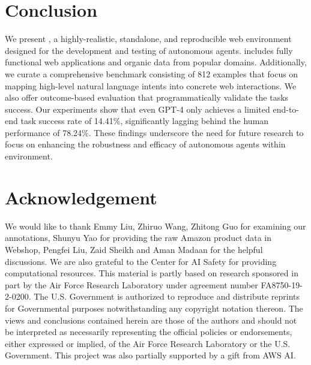 \section{Conclusion}
We present \ours, a highly-realistic, standalone, and reproducible web environment designed for the development and testing of autonomous agents. \ours includes fully functional web applications and organic data from popular domains.
Additionally, we curate a comprehensive benchmark consisting of 812 examples that focus on mapping high-level natural language intents into concrete web interactions. We also offer outcome-based evaluation that programmatically validate the tasks success.
Our experiments show that even \textsc{GPT-4} only achieves a limited end-to-end task success rate of 14.41\%, significantly lagging behind the human performance of 78.24\%. These findings underscore the need for future research to focus on enhancing the robustness and efficacy of autonomous agents within \ours environment. 

\section*{Acknowledgement}
We would like to thank Emmy Liu, Zhiruo Wang, Zhitong Guo for examining our annotations, Shunyu Yao for providing the raw Amazon product data in Webshop, Pengfei Liu, Zaid Sheikh and Aman Madaan for the helpful discussions.
We are also grateful to the Center for AI Safety for providing computational resources.
This material is partly based on research sponsored in part by the Air Force Research Laboratory under agreement number FA8750-19-2-0200. The U.S. Government is authorized to reproduce and distribute reprints for Governmental purposes notwithstanding any copyright notation thereon. The views and conclusions contained herein are those of the authors and should not be interpreted as necessarily representing the official policies or endorsements, either expressed or implied, of the Air Force Research Laboratory or the U.S. Government. This project was also partially supported by a gift from AWS AI.

\clearpage

